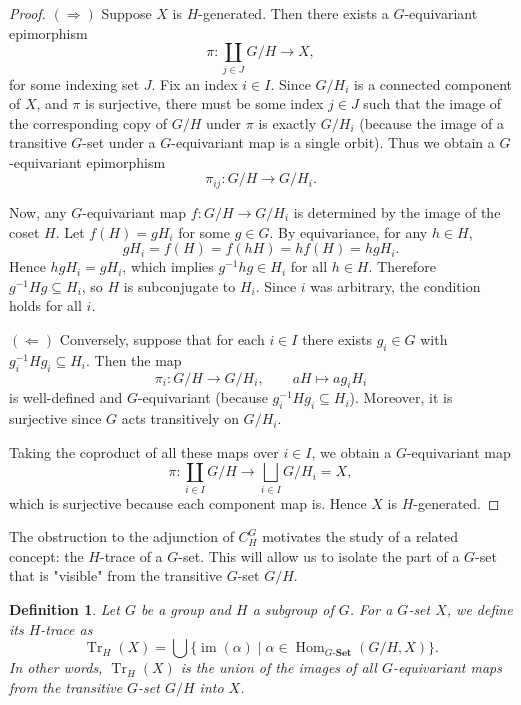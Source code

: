 \documentclass[10pt,a4paper]{amsart}
\newtheorem{definition}{Definition}
\begin{document}
\begin{proof}
$(\Rightarrow)$ Suppose $X$ is $H$-generated. Then there exists a $G$-equivariant epimorphism
\[
\pi \colon \coprod_{j \in J} G/H \longrightarrow X,
\]
for some indexing set $J$. Fix an index $i \in I$. Since $G/H_i$ is a connected component of $X$, and $\pi$ is surjective, there must be some index $j \in J$ such that the image of the corresponding copy of $G/H$ under $\pi$ is exactly $G/H_i$ (because the image of a transitive $G$-set under a $G$-equivariant map is a single orbit). Thus we obtain a $G$-equivariant epimorphism
\[
\pi_{ij} \colon G/H \longrightarrow G/H_i.
\]

Now, any $G$-equivariant map $f \colon G/H \rightarrow G/H_i$ is determined by the image of the coset $H$. Let $f(H) = g H_i$ for some $g \in G$. By equivariance, for any $h \in H$,
\[
g H_i = f(H) = f(hH) = h f(H) = h g H_i.
\]
Hence $h g H_i = g H_i$, which implies $g^{-1} h g \in H_i$ for all $h \in H$. Therefore $g^{-1} H g \subseteq H_i$, so $H$ is subconjugate to $H_i$. Since $i$ was arbitrary, the condition holds for all $i$.

$(\Leftarrow)$ Conversely, suppose that for each $i \in I$ there exists $g_i \in G$ with $g_i^{-1} H g_i \subseteq H_i$. Then the map
\[
\pi_i \colon G/H \longrightarrow G/H_i, \qquad aH \longmapsto a g_i H_i
\]
is well-defined and $G$-equivariant (because $g_i^{-1} H g_i \subseteq H_i$). Moreover, it is surjective since $G$ acts transitively on $G/H_i$.

Taking the coproduct of all these maps over $i \in I$, we obtain a $G$-equivariant map
\[
\pi \colon \coprod_{i \in I} G/H \longrightarrow \bigsqcup_{i \in I} G/H_i = X,
\]
which is surjective because each component map is. Hence $X$ is $H$-generated.
\end{proof}

The obstruction to the adjunction of $C_H^G$ motivates the study of a related concept: the $H$-trace of a $G$-set. This will allow us to isolate the part of a $G$-set that is "visible" from the transitive $G$-set $G/H$.

\begin{definition}\label{def:H_trace}
Let $G$ be a group and $H$ a subgroup of $G$. For a $G$-set $X$, we define its \emph{$H$-trace} as
\[
\operatorname{Tr}_H(X) = \bigcup \bigl\{ \operatorname{im}(\alpha) \mid \alpha \in \operatorname{Hom}_{G\text{-}\mathbf{Set}}(G/H, X) \bigr\}.
\]
In other words, $\operatorname{Tr}_H(X)$ is the union of the images of all $G$-equivariant maps from the transitive $G$-set $G/H$ into $X$.
\end{definition}
\end{document}
